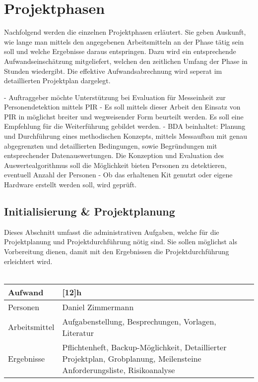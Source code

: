 \section{Projektphasen}

Nachfolgend werden die einzelnen Projektphasen erläutert. Sie geben Auskunft, wie lange man mittels den angegebenen Arbeitsmitteln an der Phase tätig sein soll und welche Ergebnisse daraus entspringen. Dazu wird ein entsprechende Aufwandseinschätzung mitgeliefert, welchen den zeitlichen Umfang der Phase in Stunden wiedergibt. Die effektive Aufwandsabrechnung wird seperat im detaillierten Projektplan dargelegt. 

-	Auftraggeber möchte Unterstützung bei Evaluation für Messeinheit zur Personendetektion mittels PIR
-	Es soll mittels dieser Arbeit den Einsatz von PIR in möglichst breiter und wegweisender Form beurteilt werden. Es soll eine Empfehlung für die Weiterführung gebildet werden.
-	BDA beinhaltet: Planung und Durchführung eines methodischen Konzepts, mittels Messaufbau mit genau abgegrenzten und detaillierten Bedingungen, sowie   Begründungen mit entsprechender Datenauswertungen. Die Konzeption und Evaluation des Auswertealgorithmus soll die Möglichkeit bieten Personen zu detektieren, eventuell Anzahl der Personen
-	Ob das erhaltenen Kit genutzt oder eigene Hardware erstellt werden soll, wird geprüft.




\subsection{Initialisierung \& Projektplanung}
\label{sec:init} 
Dieses Abschnitt umfasst die administrativen Aufgaben, welche für die Projektplanung und Projektdurchführung nötig sind. Sie sollen möglichst als Vorbereitung dienen, damit mit den Ergebnissen die Projektdurchführung erleichtert wird.\\ \\
\begin{tabularx}{\textwidth}{|l|X|}
	\hline
	Aufwand & [12]{h} \\ \hline
	Personen & Daniel Zimmermann \\\hline
	Arbeitsmittel & Aufgabenstellung, Besprechungen, Vorlagen, Literatur \\ \hline
	Ergebnisse & Pflichtenheft, Backup-Möglichkeit, Detaillierter Projektplan, Grobplanung, Meilensteine  Anforderungsliste, Risikoanalyse \\ \hline
\end{tabularx}

